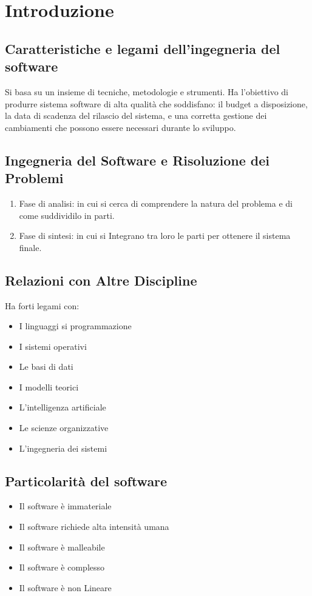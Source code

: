 \documentclass{article}
\begin{document}
	\section{Introduzione}
	\subsection{Caratteristiche e legami dell’ingegneria del software}
	Si basa su un insieme di tecniche, metodologie e strumenti. Ha l’obiettivo di produrre sistema software di alta qualità che soddisfano: il budget a disposizione, la data di scadenza del rilascio del sistema, e una corretta gestione dei cambiamenti che possono essere necessari durante lo sviluppo.
	\subsection{Ingegneria del Software e Risoluzione dei Problemi}
	\begin{enumerate}
		\item Fase di analisi: in cui si cerca di comprendere la natura del problema e di come suddividilo in parti.
		\item Fase di sintesi: in cui si Integrano tra loro le parti per ottenere
		il sistema finale.
	\end{enumerate}
	\subsection{Relazioni con Altre Discipline}
	Ha forti legami con:
	\begin{itemize}
		\item I linguaggi si programmazione
		\item I sistemi operativi
		\item Le basi di dati
		\item I modelli teorici
		\item L'intelligenza artificiale
		\item Le scienze organizzative
		\item L'ingegneria dei sistemi
	\end{itemize}
	\subsection{Particolarità del software}
	\begin{itemize}
		\item Il software è immateriale
		\item Il software richiede alta intensità umana
		\item Il software è malleabile
		\item Il software è complesso
		\item Il software è non Lineare
	\end{itemize}
\end{document}
